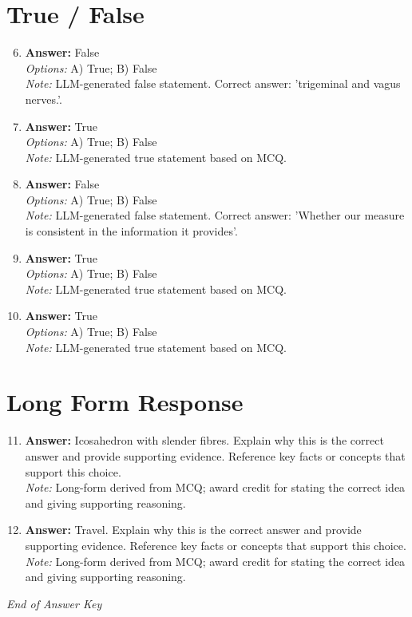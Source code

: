 \documentclass[12pt]{article}
\begin{document}
\section*{True / False}
\begin{enumerate}[label=\arabic*.]
\setcounter{enumi}{5}
\item \textbf{Answer:} False
\\ \textit{Options:} A) True; B) False
\\ \textit{Note:} LLM-generated false statement. Correct answer: 'trigeminal and vagus nerves.'.
\item \textbf{Answer:} True
\\ \textit{Options:} A) True; B) False
\\ \textit{Note:} LLM-generated true statement based on MCQ.
\item \textbf{Answer:} False
\\ \textit{Options:} A) True; B) False
\\ \textit{Note:} LLM-generated false statement. Correct answer: 'Whether our measure is consistent in the information it provides'.
\item \textbf{Answer:} True
\\ \textit{Options:} A) True; B) False
\\ \textit{Note:} LLM-generated true statement based on MCQ.
\item \textbf{Answer:} True
\\ \textit{Options:} A) True; B) False
\\ \textit{Note:} LLM-generated true statement based on MCQ.
\end{enumerate}

\section*{Long Form Response}
\begin{enumerate}[label=\arabic*.]
\setcounter{enumi}{10}
\item \textbf{Answer:} Icosahedron with slender fibres. Explain why this is the correct answer and provide supporting evidence. Reference key facts or concepts that support this choice.
\\ \textit{Note:} Long-form derived from MCQ; award credit for stating the correct idea and giving supporting reasoning.
\item \textbf{Answer:} Travel. Explain why this is the correct answer and provide supporting evidence. Reference key facts or concepts that support this choice.
\\ \textit{Note:} Long-form derived from MCQ; award credit for stating the correct idea and giving supporting reasoning.
\end{enumerate}

\vfill
\noindent\textit{End of Answer Key}
\end{document}

